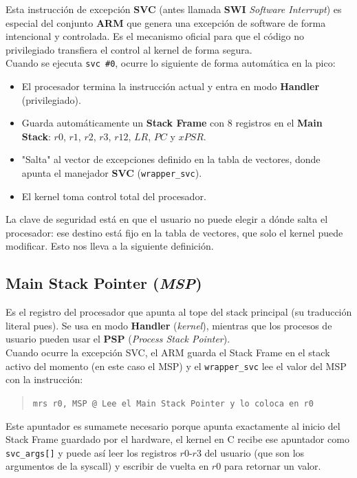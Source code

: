 \documentclass[12pt,letterpaper]{article}
\begin{document}
Esta instrucción de excepción \textbf{SVC} (antes llamada \textbf{SWI} \textit{Software Interrupt}) es especial del conjunto \textbf{ARM} que genera una excepción de software de forma intencional y controlada. Es el mecanismo oficial para que el código no privilegiado transfiera el control al kernel de forma segura.\\

\noindent
Cuando se ejecuta \texttt{svc \#0}, ocurre lo siguiente de forma automática en la pico:

\begin{itemize}
\item El procesador termina la instrucción actual y entra en modo \textbf{Handler} (privilegiado).
\item Guarda automáticamente un \textbf{Stack Frame} con 8 registros en el \textbf{Main Stack}: $r0$, $r1$, $r2$, $r3$, $r12$, $LR$, $PC$ y $xPSR$.
\item "Salta" al vector de excepciones definido en la tabla de vectores, donde apunta el manejador \textbf{SVC} (\texttt{wrapper\_svc}).
\item El kernel toma control total del procesador.
\end{itemize}

\noindent
La clave de seguridad está en que el usuario no puede elegir a dónde salta el procesador: ese destino está fijo en la tabla de vectores, que solo el kernel puede modificar. Esto nos lleva a la siguiente definición.

\subsection*{Main Stack Pointer (\textit{MSP})}

Es el registro del procesador que apunta al tope del stack principal (su traducción literal pues). Se usa en modo \textbf{Handler} (\textit{kernel}), mientras que los procesos de usuario pueden usar el \textbf{PSP} (\textit{Process Stack Pointer}).\\

\noindent
Cuando ocurre la excepción SVC, el ARM guarda el Stack Frame en el stack activo del momento (en este caso el MSP) y el \texttt{wrapper\_svc} lee el valor del MSP con la instrucción:

\begin{quote}
  \texttt{mrs r0, MSP    @ Lee el Main Stack Pointer y lo coloca en r0}
\end{quote}

\noindent
Este apuntador es sumamete necesario porque apunta exactamente al inicio del Stack Frame guardado por el hardware, el kernel en C recibe ese apuntador como \texttt{svc\_args[]} y puede así leer los registros $r0$-$r3$ del usuario (que son los argumentos de la syscall) y escribir de vuelta en $r0$ para retornar un valor.\\
\end{document}
